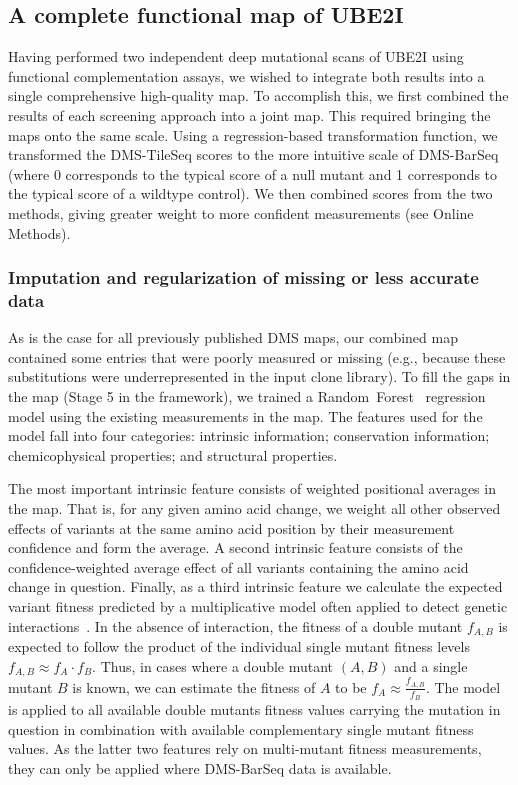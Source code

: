 \subsection{A complete functional map of UBE2I}

Having performed two independent deep mutational scans of UBE2I using functional complementation assays, we wished to integrate both results into a single comprehensive high-quality map. To accomplish this, we first combined the results of each screening approach into a joint map.  This required bringing the maps onto the same scale. Using a regression-based transformation function, we transformed the DMS-TileSeq scores to the more intuitive scale of DMS-BarSeq (where 0 corresponds to the typical score of a null mutant and 1 corresponds to the typical score of a wildtype control). We then combined scores from the two methods, giving greater weight to more confident measurements (see Online Methods).

\subsubsection{Imputation and regularization of missing or less accurate data}

As is the case for all previously published DMS maps, our combined map contained some entries that were poorly measured or missing (e.g., because these substitutions were underrepresented in the input clone library). To fill the gaps in the map (Stage 5 in the framework), we trained a Random~Forest~\cite{breiman_random_2001} regression model using the existing measurements in the map. The features used for the model fall into four categories: intrinsic information; conservation information; chemicophysical properties; and structural properties. 

The most important intrinsic feature consists of weighted positional averages in the map. That is, for any given amino acid change, we weight all other observed effects of variants at the same amino acid position by their measurement confidence and form the average. A second intrinsic feature consists of the confidence-weighted average effect of all variants containing the amino acid change in question. Finally, as a third intrinsic feature we calculate the expected variant fitness predicted by a multiplicative model often applied to detect genetic interactions~\cite{phillips_language_1998,onge_systematic_2007}. In the absence of interaction, the fitness of a double mutant $f_{A,B}$ is expected to follow the product of the individual single mutant fitness levels $f_{A,B}\approx f_A \cdot f_B$. Thus, in cases where a double mutant $(A,B)$ and a single mutant $B$ is known, we can estimate the fitness of $A$ to be $f_A\approx \frac{f_{A,B}}{f_B}$. The model is applied to all available double mutants fitness values carrying the mutation in question in combination with available complementary single mutant fitness values. As the latter two features rely on multi-mutant fitness measurements, they can only be applied where DMS-BarSeq data is available. 

